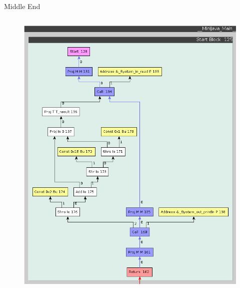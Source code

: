 \documentclass[en,16:9]{sdqbeamer}
\begin{document}
\begin{frame}{Middle End}
\begin{columns}
		\begin{column}{0.3\linewidth}
			\begin{figure}
				\centering
				\includegraphics[scale=0.2]{images/optimization-after.png}
			\end{figure}
		\end{column}
	\end{columns}
\end{frame}
\end{document}
